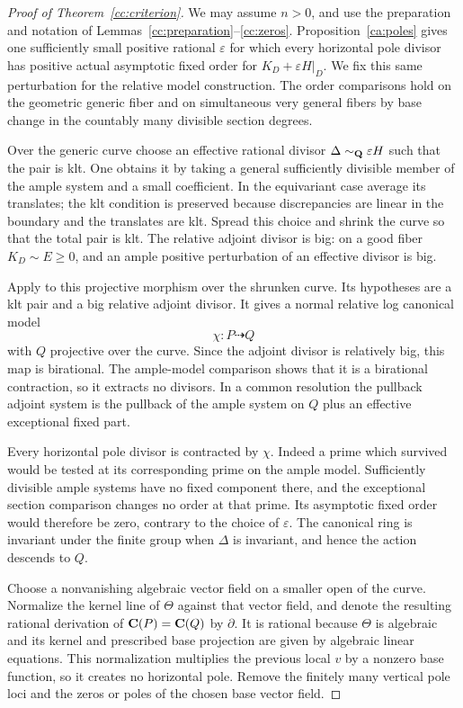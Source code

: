 \begin{proof}[Proof of Theorem~\ref{cc:criterion}]
We may assume $n>0$, and use the preparation and notation of
Lemmas~\ref{cc:preparation}--\ref{cc:zeros}.
Proposition~\ref{ca:poles} gives one sufficiently small positive rational
$\varepsilon$ for which every horizontal pole divisor has positive
actual asymptotic fixed order for $K_D+\varepsilon H|_D$.
We fix this same perturbation for the relative model construction.
The order comparisons hold on the geometric generic fiber and on
simultaneous very general fibers by base change in the countably many
divisible section degrees.

Over the generic curve choose an effective rational divisor
$\Delta\sim_{\mathbf Q}\varepsilon H$ such that the pair is klt.  One obtains
it by taking a general sufficiently divisible member of the ample
system and a small coefficient.  In the equivariant case average its
translates; the klt condition is preserved because discrepancies are
linear in the boundary and the translates are klt.  Spread this choice
and shrink the curve so that the total pair is klt.  The relative
adjoint divisor is big: on a good fiber $K_D\sim E\ge0$, and an ample
positive perturbation of an effective divisor is big.

Apply \cite[Theorem~1.2(2)]{BCHM} to this projective morphism over the
shrunken curve.  Its hypotheses are a klt pair and a big relative
adjoint divisor.  It gives a normal relative log canonical model
\[
                         \chi:P\dashrightarrow Q
\]
with $Q$ projective over the curve.  Since the adjoint divisor is
relatively big, this map is birational.  The ample-model comparison
\cite[Definitions~3.6.4 and~3.6.6, Lemma~3.6.5(4)]{BCHM} shows that it
is a birational contraction, so it extracts no divisors.  In a common
resolution the pullback adjoint system is the pullback of the ample
system on $Q$ plus an effective exceptional fixed part.

Every horizontal pole divisor is contracted by $\chi$.  Indeed a prime
which survived would be tested at its corresponding prime on the ample
model.  Sufficiently divisible ample systems have no fixed component
there, and the exceptional section comparison changes no order at that
prime.  Its asymptotic fixed order would therefore be zero, contrary to
the choice of $\varepsilon$.
The canonical ring is invariant under the finite group when $\Delta$
is invariant, and hence the action descends to $Q$.

Choose a nonvanishing algebraic vector field on a smaller open of the
curve.  Normalize the kernel line of $\Theta$ against that vector
field, and denote the resulting rational derivation of $\mathbf C(P)=\mathbf C(Q)$
by $\partial$.  It is rational because $\Theta$ is algebraic and its
kernel and prescribed base projection are given by algebraic linear
equations.  This normalization multiplies the previous local $v$ by a
nonzero base function, so it creates no horizontal pole.  Remove the
finitely many vertical pole loci and the zeros or poles of the chosen
base vector field.


\end{proof}
